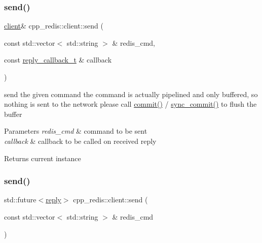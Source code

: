 \subsubsection{\texorpdfstring{send()}{send()}\hspace{0.1cm}{\footnotesize\ttfamily [1/2]}}
{\footnotesize\ttfamily \hyperlink{classcpp__redis_1_1client}{client}\& cpp\+\_\+redis\+::client\+::send (\begin{DoxyParamCaption}\item[{const std\+::vector$<$ std\+::string $>$ \&}]{redis\+\_\+cmd,  }\item[{const \hyperlink{classcpp__redis_1_1client_a061a1140d36d2eaeda82b09a0bb3f9f2}{reply\+\_\+callback\+\_\+t} \&}]{callback }\end{DoxyParamCaption})}

send the given command the command is actually pipelined and only buffered, so nothing is sent to the network please call \hyperlink{classcpp__redis_1_1client_a36a48d61a4900e88fd67795ca59cbea3}{commit()} / \hyperlink{classcpp__redis_1_1client_a23c8a27ee691c52713411ae91e1391fb}{sync\+\_\+commit()} to flush the buffer


\begin{DoxyParams}{Parameters}
{\em redis\+\_\+cmd} & command to be sent \\
\hline
{\em callback} & callback to be called on received reply \\
\hline
\end{DoxyParams}
\begin{DoxyReturn}{Returns}
current instance 
\end{DoxyReturn}
\mbox{\label{classcpp__redis_1_1client_ad6216d6587d50694c16d68e8e182b0be}} 
\subsubsection{\texorpdfstring{send()}{send()}\hspace{0.1cm}{\footnotesize\ttfamily [2/2]}}
{\footnotesize\ttfamily std\+::future$<$\hyperlink{classcpp__redis_1_1reply}{reply}$>$ cpp\+\_\+redis\+::client\+::send (\begin{DoxyParamCaption}\item[{const std\+::vector$<$ std\+::string $>$ \&}]{redis\+\_\+cmd }\end{DoxyParamCaption})}

